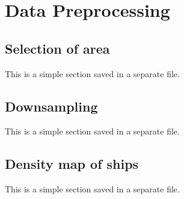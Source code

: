 \chapter[Data Preprocessing]{Data Preprocessing}
\begin{info}
\end{info}

\section{Selection of area}
\begin{info}{}
	This is a simple section saved in a separate file.
\end{info}







\section{Downsampling}
\begin{info}{}
	This is a simple section saved in a separate file.
\end{info}







\section{Density map of ships}
\begin{info}{}
	This is a simple section saved in a separate file.
\end{info}





